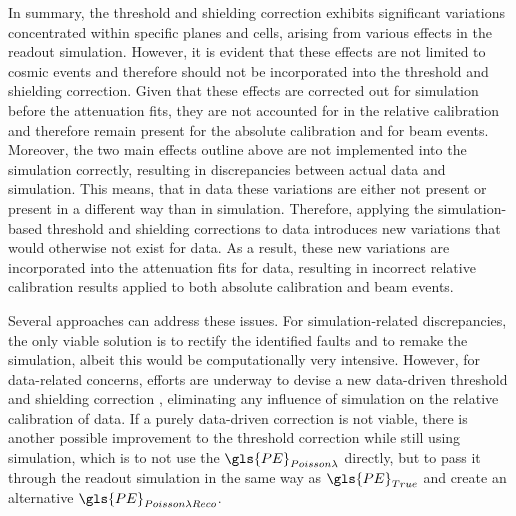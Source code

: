 In summary, the threshold and shielding correction exhibits significant variations concentrated within specific planes and cells, arising from various effects in the readout simulation. However, it is evident that these effects are not limited to cosmic events and therefore should not be incorporated into the threshold and shielding correction. Given that these effects are corrected out for simulation before the attenuation fits, they are not accounted for in the relative calibration and therefore remain present for the absolute calibration and for beam events. Moreover, the two main effects outline above are not implemented into the simulation correctly, resulting in discrepancies between actual data and simulation. This means, that in data these variations are either not present or present in a different way than in simulation. Therefore, applying the simulation-based threshold and shielding corrections to data introduces new variations that would otherwise not exist for data. As a result, these new variations are incorporated into the attenuation fits for data, resulting in incorrect relative calibration results applied to both absolute calibration and beam events.

Several approaches can address these issues. For simulation-related discrepancies, the only viable solution is to rectify the identified faults and to remake the simulation, albeit this would be computationally very intensive. However, for data-related concerns, efforts are underway to devise a new data-driven threshold and shielding correction \cite{NOvA-doc-15223}, eliminating any influence of simulation on the relative calibration of data. If a purely data-driven correction is not viable, there is another possible improvement to the threshold correction while still using simulation, which is to not use the $\gls{PE}_{Poisson \lambda}$ directly, but to pass it through the readout simulation in the same way as $\gls{PE}_{True}$ and create an alternative $\gls{PE}_{Poisson \lambda Reco}$.

